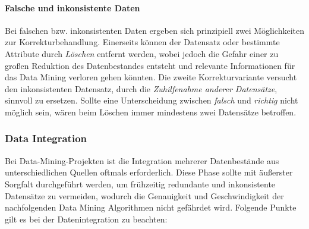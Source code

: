 \paragraph{Falsche und inkonsistente Daten}
Bei falschen bzw. inkonsistenten Daten ergeben sich prinzipiell zwei Möglichkeiten zur Korrekturbehandlung. Einerseits können der Datensatz oder bestimmte Attribute durch \textit{Löschen} entfernt werden, wobei jedoch die Gefahr einer zu großen Reduktion des Datenbestandes entsteht und relevante Informationen für das Data Mining verloren gehen könnten. Die zweite Korrekturvariante versucht den inkonsistenten Datensatz, durch die \textit{Zuhilfenahme anderer Datensätze}, sinnvoll zu ersetzen. Sollte eine Unterscheidung zwischen \textit{falsch} und \textit{richtig} nicht möglich sein, wären beim Löschen immer mindestens zwei Datensätze betroffen.

\subsubsection{Data Integration}
\label{di}
Bei Data-Mining-Projekten ist die Integration mehrerer Datenbestände aus unterschiedlichen Quellen oftmals erforderlich. Diese Phase sollte mit äußerster Sorgfalt durchgeführt werden, um frühzeitig redundante und inkonsistente Datensätze zu vermeiden, wodurch die Genauigkeit und Geschwindigkeit der nachfolgenden Data Mining Algorithmen nicht gefährdet wird. Folgende Punkte gilt es bei der Datenintegration zu beachten:

